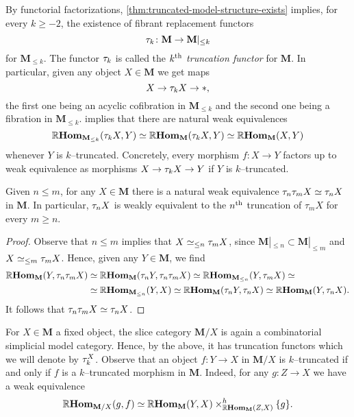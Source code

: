 By functorial factorizations,
\autoref{thm:truncated-model-structure-exists} implies, for every
\(k\geq -2\), the existence of fibrant replacement functors
\[
\tau_{k}\colon \mathbf{M}\to\mathbf{M}|_{\leq k}
\]
for \(\mathbf M_{\leq k}\). The functor \(\tau_{k}\) is called the
\emph{\(k\textsuperscript{th}\) truncation functor} for
\(\mathbf{M}\). In particular, given any object \(X\in\mathbf{M}\) we
get maps
\[
X\to \tau_{k} X\to *,
\]
the first one being an acyclic cofibration in \(\mathbf{M}_{\leq k}\)
and the second one being a fibration in \(\mathbf{M}_{\leq
  k}\).  implies that there are natural
weak equivalences
\[
\operatorname{\mathbb{R}\textnormal{\bfseries Hom}}_{\mathbf M_{\leq k}}(\tau_{k} X, Y)\simeq \operatorname{\mathbb{R}\textnormal{\bfseries Hom}}_{\mathbf
  M}(\tau_{k} X, Y) \simeq \operatorname{\mathbb{R}\textnormal{\bfseries Hom}}_{\mathbf M}(X, Y)
\]
whenever \(Y\) is \(k\)--truncated. Concretely, every morphism
\(f\colon X\to Y\) factors up to weak equivalence as morphisms \(X\to
\tau_{k}X\to Y\) if \(Y\) is \(k\)--truncated.

\begin{corollary}
  Given \(n \leq m\), for any \(X\in\mathbf M\) there is a natural
  weak equivalence \(\tau_{n}\tau_{m} X \simeq \tau_{n} X\) in
  \(\mathbf M\). In particular, \(\tau_{n}X\) is weakly equivalent to
  the \(n\textsuperscript{th}\) truncation of \(\tau_{m}X\) for every
  \(m\geq n\).
\end{corollary}
\begin{proof}
  Observe that \(n\leq m\) implies that \(X \simeq_{\leq
    n}\tau_{m}X\), since \(\mathbf M|_{\leq n}\subset \mathbf
  M|_{\leq m}\) and \(X\simeq_{\leq m}\tau_{m}X\). Hence, given any
  \(Y\in\mathbf M\), we find
  \begin{align*}
    \operatorname{\mathbb{R}\textnormal{\bfseries Hom}}_{\mathbf M}(Y, \tau_{n}\tau_{m} X)&\simeq \operatorname{\mathbb{R}\textnormal{\bfseries Hom}}_{\mathbf M}(\tau_{n}Y, \tau_{n}\tau_{m}X)\simeq \operatorname{\mathbb{R}\textnormal{\bfseries Hom}}_{\mathbf M_{\leq n}}(Y, \tau_{m}X)\simeq \\
    &\simeq \operatorname{\mathbb{R}\textnormal{\bfseries Hom}}_{\mathbf M_{\leq n}}(Y, X) \simeq \operatorname{\mathbb{R}\textnormal{\bfseries Hom}}_{\mathbf M}(\tau_{n}Y, \tau_{n}X)\simeq \operatorname{\mathbb{R}\textnormal{\bfseries Hom}}_{\mathbf M}(Y, \tau_{n}X).
  \end{align*}
  It follows that \(\tau_{n}\tau_{m}X\simeq \tau_{n}X\).
\end{proof}

For \(X\in\mathbf{M}\) a fixed object, the slice category \(\mathbf
M/X\) is again a combinatorial simplicial model category. Hence, by
the above, it has truncation functors which we will denote by
\(\tau_{k}^{X}\). Observe that an object \(f\colon Y\to X\) in
\(\mathbf M/X\) is \(k\)--truncated if and only if \(f\) is a
\(k\)--truncated morphism in \(\mathbf M\). Indeed, for any \(g\colon
Z\to X\) we have a weak equivalence
\[
\operatorname{\mathbb{R}\textnormal{\bfseries Hom}}_{\mathbf M/X}(g, f)\simeq \operatorname{\mathbb{R}\textnormal{\bfseries Hom}}_{\mathbf M}(Y, X)\times^{h}_{\operatorname{\mathbb{R}\textnormal{\bfseries Hom}}_{\mathbf M}(Z, X)} \{g\}.
\]

